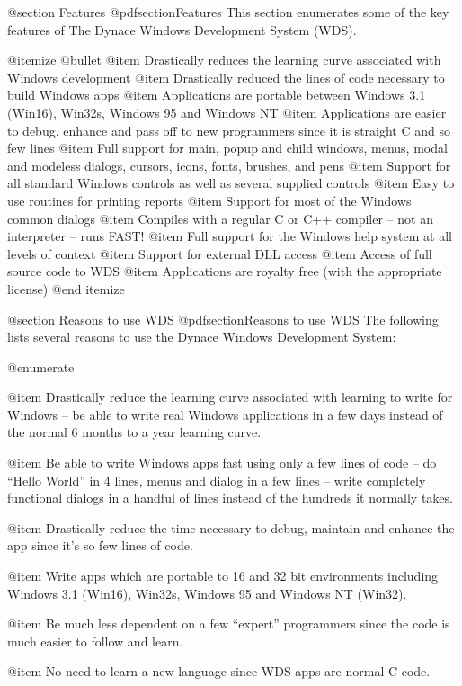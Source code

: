 @section Features
@pdfsection{Features}
This section enumerates some of the key features of The Dynace Windows
Development System (WDS).

@itemize @bullet
@item Drastically reduces the learning curve associated with Windows
development
@item Drastically reduced the lines of code necessary to build Windows apps
@item Applications are portable between Windows 3.1 (Win16), Win32s,
Windows 95 and Windows NT
@item Applications are easier to debug, enhance and pass off to new programmers
since it is straight C and so few lines
@item Full support for main, popup and child windows, menus,
modal and modeless dialogs, cursors, icons, fonts, brushes, and pens
@item Support for all standard Windows controls as well as several supplied controls
@item Easy to use routines for printing reports
@item Support for most of the Windows common dialogs
@item Compiles with a regular C or C++ compiler -- not an interpreter -- 
runs FAST!
@item Full support for the Windows help system at all levels of context
@item Support for external DLL access
@item Access of full source code to WDS
@item Applications are royalty free (with the appropriate license)
@end itemize

@section Reasons to use WDS
@pdfsection{Reasons to use WDS}
The following lists several reasons to use the Dynace Windows
Development System:

@enumerate

@item
Drastically reduce the learning curve associated with learning to
write for Windows -- be able to write real Windows applications in
a few days instead of the normal 6 months to a year learning curve.

@item
Be able to write Windows apps fast using only a few lines of code --
do ``Hello World'' in 4 lines, menus and dialog in a few lines -- write
completely functional dialogs in a handful of lines instead of the
hundreds it normally takes.

@item
Drastically reduce the time necessary to debug, maintain and enhance the
app since it's so few lines of code.

@item
Write apps which are portable to 16 and 32 bit environments including
Windows 3.1 (Win16), Win32s, Windows 95 and Windows NT (Win32).

@item
Be much less dependent on a few ``expert'' programmers since the code
is much easier to follow and learn.

@item
No need to learn a new language since WDS apps are normal C code.


